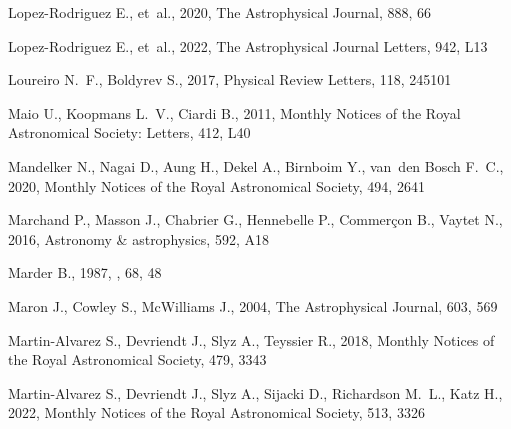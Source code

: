 \documentclass[12pt,twoside]{extreport}
\begin{document}
\begin{thebibliography}{}
Lopez-Rodriguez E.,  et~al., 2020, The Astrophysical Journal, 888, 66

Lopez-Rodriguez E.,  et~al., 2022, The Astrophysical Journal Letters, 942, L13

Loureiro N.~F.,  Boldyrev S.,  2017, Physical Review Letters, 118, 245101

Maio U.,  Koopmans L.~V.,   Ciardi B.,  2011, Monthly Notices of the Royal
  Astronomical Society: Letters, 412, L40

Mandelker N.,  Nagai D.,  Aung H.,  Dekel A.,  Birnboim Y.,   van~den Bosch
  F.~C.,  2020, Monthly Notices of the Royal Astronomical Society, 494, 2641

Marchand P.,  Masson J.,  Chabrier G.,  Hennebelle P.,  Commer{\c{c}}on B.,
  Vaytet N.,  2016, Astronomy \& astrophysics, 592, A18

Marder B.,  1987, , 68, 48

Maron J.,  Cowley S.,   McWilliams J.,  2004, The Astrophysical Journal, 603,
  569

Martin-Alvarez S.,  Devriendt J.,  Slyz A.,   Teyssier R.,  2018, Monthly
  Notices of the Royal Astronomical Society, 479, 3343

Martin-Alvarez S.,  Devriendt J.,  Slyz A.,  Sijacki D.,  Richardson M.~L.,
  Katz H.,  2022, Monthly Notices of the Royal Astronomical Society, 513, 3326


\end{thebibliography}
\end{document}
